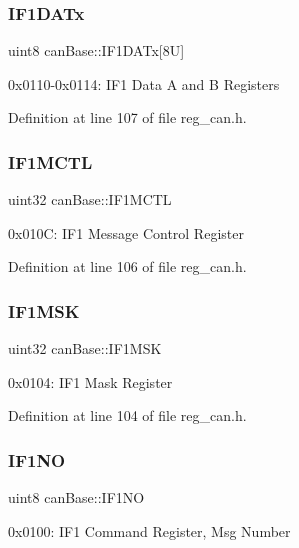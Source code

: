 \subsubsection{\texorpdfstring{I\+F1\+D\+A\+Tx}{IF1DATx}}
{\footnotesize\ttfamily uint8 can\+Base\+::\+I\+F1\+D\+A\+Tx\mbox{[}8\+U\mbox{]}}

0x0110-\/0x0114\+: I\+F1 Data A and B Registers 

Definition at line 107 of file reg\+\_\+can.\+h.

\mbox{\label{structcanBase_a45411a2628aeb311646530e2611a8abd}} 
\subsubsection{\texorpdfstring{I\+F1\+M\+C\+TL}{IF1MCTL}}
{\footnotesize\ttfamily uint32 can\+Base\+::\+I\+F1\+M\+C\+TL}

0x010C\+: I\+F1 Message Control Register 

Definition at line 106 of file reg\+\_\+can.\+h.

\mbox{\label{structcanBase_ade8667cd34fc6007d13e4a32d9c53cfb}} 
\subsubsection{\texorpdfstring{I\+F1\+M\+SK}{IF1MSK}}
{\footnotesize\ttfamily uint32 can\+Base\+::\+I\+F1\+M\+SK}

0x0104\+: I\+F1 Mask Register 

Definition at line 104 of file reg\+\_\+can.\+h.

\mbox{\label{structcanBase_ac2e6befca4e4435e203ba4fa153c77c3}} 
\subsubsection{\texorpdfstring{I\+F1\+NO}{IF1NO}}
{\footnotesize\ttfamily uint8 can\+Base\+::\+I\+F1\+NO}

0x0100\+: I\+F1 Command Register, Msg Number 

